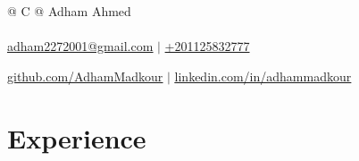 \documentclass[a4paper,10pt]{article}
\begin{document}
    \pagestyle{empty}


    \begin{tabularx}{\linewidth}{@{} C @{}}
\color[HTML]{1C033C} \Huge{Adham Ahmed} \\[6pt]
\\
\textcolor[HTML]{371e77}{\underline{\href{mailto:adham2272001@gmail.com}{\raisebox{-0.05\height}{\faEnvelope} adham2272001@gmail.com}} $|$}
\textcolor[HTML]{371e77}{\href{tel:+201125832777}{\raisebox{-0.05\height}{\faMobile} +201125832777}}

\textcolor[HTML]{371e77}{\underline{\href{https://github.com/AdhamMadkour}{\raisebox{-0.05\height}{\faGithub} github.com/AdhamMadkour}} $|$}
\textcolor[HTML]{371e77}{\underline{\href{https://www.linkedin.com/in/adhammadkour/}{\raisebox{-0.05\height}{\faLinkedin} linkedin.com/in/adhammadkour}}}
    \end{tabularx}


    \section{Experience}
\end{document}

